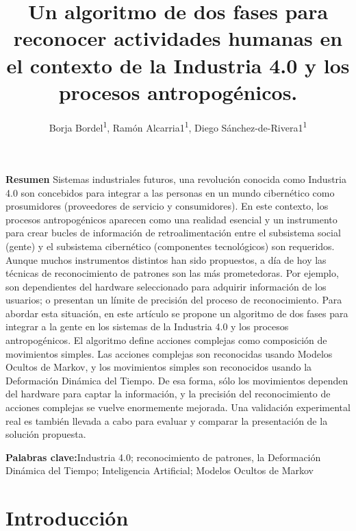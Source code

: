 \documentclass{paper}
\title{Un algoritmo de dos fases para reconocer actividades humanas en el contexto de la Industria 4.0 y los procesos antropogénicos.}
\author{Borja Bordel\textsuperscript{1}, Ramón Alcarria1\textsuperscript{1}, Diego Sánchez-de-Rivera1\textsuperscript{1}}
\begin{document}
\textbf{Resumen} Sistemas industriales futuros, una revolución conocida como Industria 4.0 son concebidos para integrar a las personas en un mundo cibernético como prosumidores (proveedores de servicio y consumidores). En este contexto, los procesos antropogénicos aparecen como una realidad esencial y un instrumento para crear bucles de información de retroalimentación entre el subsistema social (gente) y el subsistema cibernético (componentes tecnológicos) son requeridos. Aunque muchos instrumentos distintos han sido propuestos, a día de hoy las técnicas de reconocimiento de patrones  son las más prometedoras. Por ejemplo, son dependientes del hardware seleccionado para adquirir información de los usuarios; o presentan un límite de precisión del proceso de reconocimiento. Para abordar esta situación, en este artículo se propone un algoritmo de dos fases para integrar a la gente en los sistemas de la Industria 4.0 y los procesos antropogénicos. El algoritmo define acciones complejas como composición de movimientos simples. Las acciones complejas son reconocidas usando Modelos Ocultos de Markov, y los movimientos simples son reconocidos usando la Deformación Dinámica del Tiempo. De esa forma, sólo los movimientos dependen del hardware para captar la información, y la precisión del reconocimiento de acciones complejas se vuelve enormemente mejorada. Una validación experimental real es también llevada a cabo para evaluar y comparar la presentación de la solución propuesta.

\bigskip
\textbf{Palabras clave:}Industria 4.0; reconocimiento de patrones, la Deformación Dinámica del Tiempo; Inteligencia Artificial; Modelos Ocultos de Markov



\section{Introducción}
\end{document}
